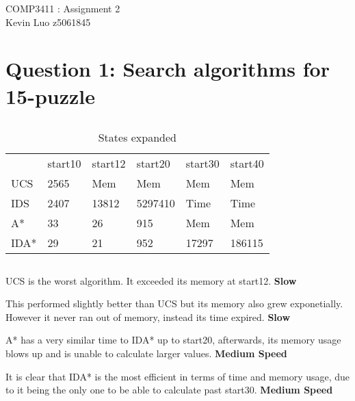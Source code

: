 \documentclass[12pt]{article}
\begin{document}
\begin{center}
{\large COMP3411 : Assignment 2} \\ %
Kevin Luo z5061845 \\
\end{center}

\section{Question 1: Search algorithms for 15-puzzle}

\subsection{}

\begin{table}[h]
\centering
\caption{States expanded}
\label{my-label}
\begin{tabular}{llllll}
     & start10 & start12 & start20 & start30 & start40 \\
UCS  & 2565    & Mem     & Mem     & Mem     & Mem     \\
IDS  & 2407    & 13812   & 5297410 & Time    & Time    \\
A*   & 33      & 26      & 915     & Mem     & Mem     \\
IDA* & 29      & 21      & 952     & 17297   & 186115
\end{tabular}
\end{table}

\subsection{}

\begin{description}[font=$\bullet$\scshape\bfseries]
  \item [UCS] UCS is the worst algorithm. It exceeded its memory at start12. \textbf{Slow}
  \item [IDS] This performed slightly better than UCS but its memory also grew exponetially. However it never ran out of memory, instead its time expired. \textbf{Slow}
  \item [A*] A* has a very similar time to IDA* up to start20, afterwards, its memory usage blows up and is unable to calculate larger values. \textbf{Medium Speed}
  \item [IDA*] It is clear that IDA* is the most efficient in terms of time and memory usage, due to it being the only one to be able to calculate past start30. \textbf{Medium Speed}
\end{description}
\end{document}
